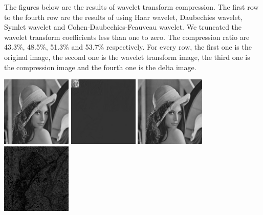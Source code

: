 \documentclass{article}
\begin{document}
The figures below are the results of wavelet transform compression.
The first row to the fourth row are the results of using Haar wavelet, Daubechies wavelet, Symlet wavelet and Cohen-Daubechies-Feauveau wavelet. We truncated the wavelet transform coefficients less than one to zero. The compression ratio are 43.3\%, 48.5\%, 51.3\% and 53.7\% respectively. For every row, the first one is the original image, the second one is the wavelet transform image, the third one is the compression image and the fourth one is the delta image.

\includegraphics[width=0.25\textwidth]{../data/lenna.jpg}
\includegraphics[width=0.25\textwidth]{../data/haar_transform_lenna.jpg}
\includegraphics[width=0.25\textwidth]{../data/haar_lenna.jpg}
\includegraphics[width=0.25\textwidth]{../data/delta_haar_lenna.jpg}
\end{document}
